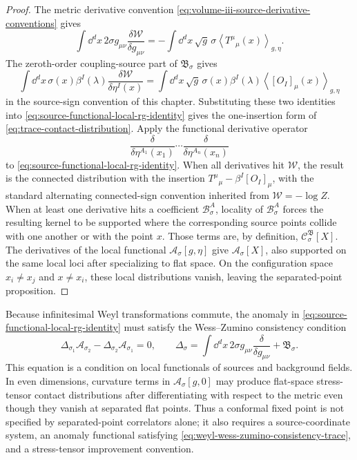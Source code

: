 \begin{proof}
The metric derivative convention
\eqref{eq:volume-iii-source-derivative-conventions} gives
\[
  \int\dd^d x\,2\sigma g_{\mu\nu}
  \frac{\delta\mathcal W}{\delta g_{\mu\nu}}
  =
  -\int\dd^d x\,\sqrt g\,\sigma
  \left\langle T^\mu{}_\mu(x)\right\rangle_{g,\eta}.
\]
The zeroth-order coupling-source part of \(\mathfrak B_\sigma\) gives
\[
  \int\dd^d x\,\sigma(x)\beta^I(\lambda)
  \frac{\delta\mathcal W}{\delta\eta^I(x)}
  =
  \int\dd^d x\,\sqrt g\,\sigma(x)\beta^I(\lambda)
  \left\langle [O_I]_\mu(x)\right\rangle_{g,\eta}
\]
in the source-sign convention of this chapter.  Substituting these two
identities into \eqref{eq:source-functional-local-rg-identity} gives the
one-insertion form of \eqref{eq:trace-contact-distribution}.  Apply the
functional derivative operator
\[
  \frac{\delta}{\delta\eta^{A_1}(x_1)}\cdots
  \frac{\delta}{\delta\eta^{A_n}(x_n)}
\]
to \eqref{eq:source-functional-local-rg-identity}.  When all derivatives hit
\(\mathcal W\), the result is the connected distribution with the insertion
\(T^\mu{}_\mu-\beta^I[O_I]_\mu\), with the standard alternating connected-sign
convention inherited from \(\mathcal W=-\log Z\).  When at least one derivative
hits a coefficient \(\mathcal B^A_\sigma\), locality of
\(\mathcal B^A_\sigma\) forces the resulting kernel to be supported where the
corresponding source points collide with one another or with the point \(x\).
Those terms are, by definition, \(\mathcal C_\sigma^{\mathfrak B}[X]\).  The
derivatives of the local functional \(\mathcal A_\sigma[g,\eta]\) give
\(\mathcal A_\sigma[X]\), also supported on the same local loci after
specializing to flat space.  On the configuration space
\(x_i\ne x_j\) and \(x\ne x_i\), these local distributions vanish, leaving the
separated-point proposition.
\end{proof}

Because infinitesimal Weyl transformations commute, the anomaly in
\eqref{eq:source-functional-local-rg-identity} must satisfy the Wess--Zumino
consistency condition
\begin{equation}
  \Delta_{\sigma_1}\mathcal A_{\sigma_2}
  -
  \Delta_{\sigma_2}\mathcal A_{\sigma_1}
  =
  0,
  \qquad
  \Delta_\sigma
  =
  \int\dd^d x\,2\sigma g_{\mu\nu}
  \frac{\delta}{\delta g_{\mu\nu}}
  +
  \mathfrak B_\sigma .
  \label{eq:weyl-wess-zumino-consistency-trace}
\end{equation}
This equation is a condition on local functionals of sources and background
fields.  In even dimensions, curvature terms in \(\mathcal A_\sigma[g,0]\) may
produce flat-space stress-tensor contact distributions after differentiating
with respect to the metric even though they vanish at separated flat points.
Thus a conformal fixed point is not specified by separated-point correlators
alone; it also requires a source-coordinate system, an anomaly functional satisfying
\eqref{eq:weyl-wess-zumino-consistency-trace}, and a stress-tensor improvement
convention.

